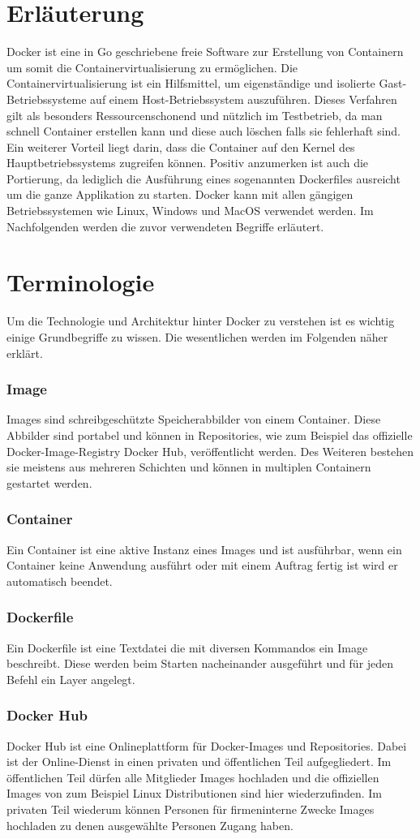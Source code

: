 \section*{Erläuterung}
Docker ist eine in Go geschriebene freie Software zur Erstellung von Containern um somit die Containervirtualisierung zu ermöglichen. Die Containervirtualisierung ist ein Hilfsmittel, um eigenständige und isolierte Gast-Betriebssysteme auf einem Host-Betriebssystem auszuführen. Dieses Verfahren gilt als besonders Ressourcenschonend und nützlich im Testbetrieb, da man schnell Container erstellen kann und diese auch löschen falls sie fehlerhaft sind. Ein weiterer Vorteil liegt darin, dass die Container auf den Kernel des Hauptbetriebssystems zugreifen können. Positiv anzumerken ist auch die Portierung, da lediglich die Ausführung eines sogenannten Dockerfiles ausreicht um die ganze Applikation zu starten. Docker kann mit allen gängigen Betriebssystemen wie Linux, Windows und MacOS verwendet werden. Im Nachfolgenden werden die zuvor verwendeten Begriffe erläutert.

\section*{Terminologie}
Um die Technologie und Architektur hinter Docker zu verstehen ist es wichtig einige Grundbegriffe zu wissen. Die wesentlichen werden im Folgenden näher erklärt.
\subsubsection*{Image}
Images sind schreibgeschützte Speicherabbilder von einem Container. Diese Abbilder sind portabel und können in Repositories, wie zum Beispiel das offizielle Docker-Image-Registry Docker Hub, veröffentlicht werden. Des Weiteren bestehen sie meistens aus mehreren Schichten und können in multiplen Containern gestartet werden.
\subsubsection*{Container}
Ein Container ist eine aktive Instanz eines Images und ist ausführbar, wenn ein Container keine Anwendung ausführt oder mit einem Auftrag fertig ist wird er automatisch beendet.
\subsubsection*{Dockerfile}
Ein Dockerfile ist eine Textdatei die mit diversen Kommandos ein Image beschreibt. Diese werden beim Starten nacheinander ausgeführt und für jeden Befehl ein Layer angelegt.
\newpage \subsubsection*{Docker Hub}
Docker Hub ist eine Onlineplattform für Docker-Images und Repositories. Dabei ist der Online-Dienst in einen privaten und öffentlichen Teil aufgegliedert. Im öffentlichen Teil dürfen alle Mitglieder Images hochladen und die offiziellen Images von zum Beispiel Linux Distributionen sind hier wiederzufinden. Im privaten Teil wiederum können Personen für firmeninterne Zwecke Images hochladen zu denen ausgewählte Personen Zugang haben.

